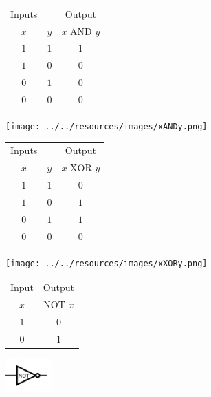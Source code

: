 \documentclass[12pt, oneside]{article}
\begin{document}
\begin{multicols}{2}
\begin{center}\begin{tabular}{cc|c}
Inputs &  & Output \\
$x$ & $y$ & $x \text{ AND } y$  \\
\hline
$1$ & $1$ & $1$\\
$1$ & $0$ & $0$\\
$0$ & $1$ & $0$\\
$0$ & $0$ & $0$\\
\end{tabular}\end{center}
\columnbreak
\begin{center}\texttt{[image: ../../resources/images/xANDy.png]} \end{center}
\end{multicols}

\begin{multicols}{2}
\begin{center}\begin{tabular}{cc|c}
Inputs &  & Output \\
$x$ & $y$ & $x \text{ XOR } y$  \\
\hline
$1$ & $1$ & $0$\\
$1$ & $0$ & $1$\\
$0$ & $1$ & $1$\\
$0$ & $0$ & $0$\\
\end{tabular}\end{center}
\columnbreak
\begin{center}\texttt{[image: ../../resources/images/xXORy.png]} \end{center}
\end{multicols}

\begin{multicols}{2}
\begin{center}\begin{tabular}{c|c}
Input  & Output \\
$x$ & $\text{NOT } x$  \\
\hline
$1$ & $0$\\
$0$ & $1$\\
\end{tabular}\end{center}
\columnbreak
\begin{center}\includegraphics[height=0.5in]{../../resources/images/NOTx.png} \end{center}
\end{multicols}
\end{document}
